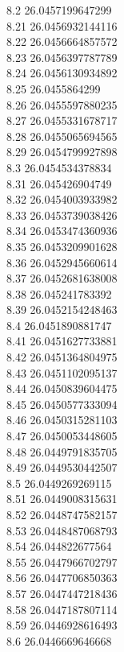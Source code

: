 {8.2	26.0457199647299\\
8.21	26.0456932144116\\
8.22	26.0456664857572\\
8.23	26.0456397787789\\
8.24	26.0456130934892\\
8.25	26.0455864299\\
8.26	26.0455597880235\\
8.27	26.0455331678717\\
8.28	26.0455065694565\\
8.29	26.0454799927898\\
8.3	26.0454534378834\\
8.31	26.045426904749\\
8.32	26.0454003933982\\
8.33	26.0453739038426\\
8.34	26.0453474360936\\
8.35	26.0453209901628\\
8.36	26.0452945660614\\
8.37	26.0452681638008\\
8.38	26.045241783392\\
8.39	26.0452154248463\\
8.4	26.0451890881747\\
8.41	26.0451627733881\\
8.42	26.0451364804975\\
8.43	26.0451102095137\\
8.44	26.0450839604475\\
8.45	26.0450577333094\\
8.46	26.0450315281103\\
8.47	26.0450053448605\\
8.48	26.0449791835705\\
8.49	26.0449530442507\\
8.5	26.0449269269115\\
8.51	26.0449008315631\\
8.52	26.0448747582157\\
8.53	26.0448487068793\\
8.54	26.044822677564\\
8.55	26.0447966702797\\
8.56	26.0447706850363\\
8.57	26.0447447218436\\
8.58	26.0447187807114\\
8.59	26.0446928616493\\
8.6	26.0446669646668\\
}
